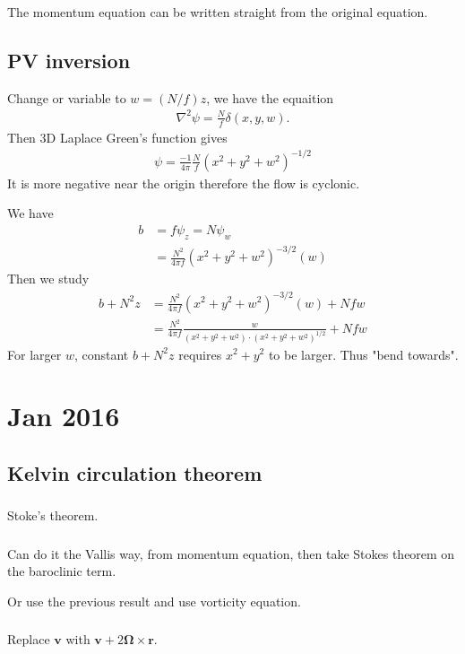 \documentclass[11pt,letterpaper]{book}
\theoremstyle{definition}
\newcommand{\ve}[1]{\boldsymbol{#1}}
\begin{document}
The momentum equation can be written straight from the original equation.

\section{PV inversion}
Change or variable to $w = (N/f)z$, we have the equaition
\begin{align*}
    \nabla^2 \psi = \frac{N}{f}\delta(x,y,w).
\end{align*}
Then 3D Laplace Green's function gives
\begin{align*}
    \psi = \frac{-1}{4\pi}\frac{N}{f}(x^2+y^2+w^2)^{-1/2}
\end{align*}
It is more negative near the origin therefore the flow is cyclonic.

We have
\begin{align*}
    b &= f\psi_z = N\psi_w\\
    &= \frac{N^2}{4\pi f}(x^2+y^2+w^2)^{-3/2}(w)
\end{align*}
Then we study
\begin{align*}
    b+N^2z &= \frac{N^2}{4\pi f}(x^2+y^2+w^2)^{-3/2}(w)+Nfw\\
    &= \frac{N^2}{4\pi f}\frac{w}{(x^2+y^2+w^2)\cdot(x^2+y^2+w^2)^{1/2}}+Nfw
\end{align*}
For larger $w$, constant $b+N^2z$ requires $x^2+y^2$ to be larger. Thus "bend towards".


\chapter{Jan 2016}
\section{Kelvin circulation theorem}
\subsection{}
Stoke's theorem.

\subsection{}
Can do it the Vallis way, from momentum equation, then take Stokes theorem on the baroclinic term.

Or use the previous result and use vorticity equation.

\subsection{}
Replace $\ve v$ with $\ve v+2\ve\Omega \times \ve r$.
\end{document}
